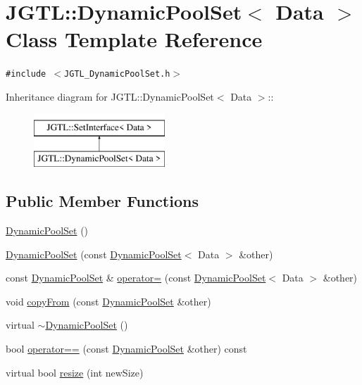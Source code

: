\hypertarget{class_j_g_t_l_1_1_dynamic_pool_set}{
\section{JGTL::Dynamic\-Pool\-Set$<$ Data $>$ Class Template Reference}
\label{class_j_g_t_l_1_1_dynamic_pool_set}
}
{\tt \#include $<$JGTL\_\-Dynamic\-Pool\-Set.h$>$}

Inheritance diagram for JGTL::Dynamic\-Pool\-Set$<$ Data $>$::\begin{figure}[H]
\begin{center}
\leavevmode
\includegraphics[height=2cm]{class_j_g_t_l_1_1_dynamic_pool_set}
\end{center}
\end{figure}
\subsection*{Public Member Functions}
\begin{CompactItemize}
\item 
\hyperlink{class_j_g_t_l_1_1_dynamic_pool_set_7782c2398e24e10e1a4e4b6571740fb2}{Dynamic\-Pool\-Set} ()
\item 
\hyperlink{class_j_g_t_l_1_1_dynamic_pool_set_d079124f4b30c87f7bb102f306f7c7ae}{Dynamic\-Pool\-Set} (const \hyperlink{class_j_g_t_l_1_1_dynamic_pool_set}{Dynamic\-Pool\-Set}$<$ Data $>$ \&other)
\item 
const \hyperlink{class_j_g_t_l_1_1_dynamic_pool_set}{Dynamic\-Pool\-Set} \& \hyperlink{class_j_g_t_l_1_1_dynamic_pool_set_dd18f7df0d3a13b31f53a13a755cd729}{operator=} (const \hyperlink{class_j_g_t_l_1_1_dynamic_pool_set}{Dynamic\-Pool\-Set}$<$ Data $>$ \&other)
\item 
void \hyperlink{class_j_g_t_l_1_1_dynamic_pool_set_b3dbb5689852c8b7305bb5e51b6f0a5f}{copy\-From} (const \hyperlink{class_j_g_t_l_1_1_dynamic_pool_set}{Dynamic\-Pool\-Set} \&other)
\item 
virtual \hyperlink{class_j_g_t_l_1_1_dynamic_pool_set_61626b46e2bd79d1c188ff76725ac50c}{$\sim$Dynamic\-Pool\-Set} ()
\item 
bool \hyperlink{class_j_g_t_l_1_1_dynamic_pool_set_6b6a5c1f4536294a29afaa22417c761a}{operator==} (const \hyperlink{class_j_g_t_l_1_1_dynamic_pool_set}{Dynamic\-Pool\-Set} \&other) const 
\item 
virtual bool \hyperlink{class_j_g_t_l_1_1_dynamic_pool_set_f9c2b0ebc042c33dca8fee5af6583446}{resize} (int new\-Size)
\end{CompactItemize}
